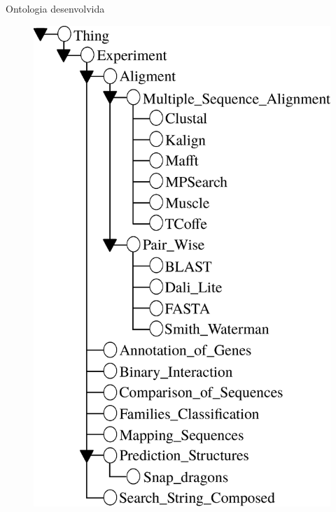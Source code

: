 \begin{frame}		
	\begin{block}{Ontologia desenvolvida}
		\begin{figure}
			\begin{minipage}[b]{0.3\textwidth}
				\includegraphics[width=\textwidth]{./secoes/SolucaoProposta/ontologia.eps}
			\end{minipage}
		\end{figure}
	\end{block}
\end{frame}


